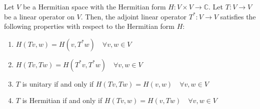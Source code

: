 \documentclass[openany]{book}
\renewcommand{\C}{\mathbb{C}}
\begin{document}
\begin{mytheorem}
Let $V$ be a Hermitian space with the Hermitian form $H: V \times V \to \C$. Let $T: V \to V$ be a linear operator on $V$. Then, the adjoint linear operator $T^*: V \to V$ satisfies the following properties with respect to the Hermitian form $H$:
\begin{enumerate}
    \item $H(Tv, w) = H(v, T^* w) \quad \forall v, w \in V$
    \item $H(Tv, Tw) = H(T^*v, T^*w) \quad \forall v, w \in V$
    \item $T$ is unitary if and only if $H(Tv, Tw) = H(v, w) \quad \forall v, w \in V$
    \item $T$ is Hermitian if and only if $H(Tv, w) = H(v, Tw) \quad \forall v, w \in V$
\end{enumerate}
\end{mytheorem}
\end{document}
